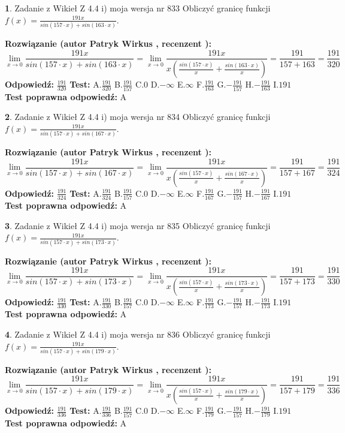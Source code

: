 \documentclass[12pt, a4paper]{article}
\theoremstyle{definition} %
\newtheorem{zad}{}
\newcommand{\zadStart}[1]{\begin{zad}#1\newline}
\newcommand{\zadStop}{\end{zad}}
\newcommand{\rozwStart}[2]{\noindent \textbf{Rozwiązanie (autor #1 , recenzent #2): }\newline}
\newcommand{\rozwStop}{\newline}
\newcommand{\odpStart}{\noindent \textbf{Odpowiedź:}\newline}
\newcommand{\odpStop}{\newline}
\newcommand{\testStart}{\noindent \textbf{Test:}\newline}
\newcommand{\testStop}{\newline}
\newcommand{\kluczStart}{\noindent \textbf{Test poprawna odpowiedź:}\newline}
\newcommand{\kluczStop}{\newline}
\begin{document}
\zadStart{Zadanie z Wikieł Z 4.4 i) moja wersja nr 833}
Obliczyć granicę funkcji $f(x)=\frac{191x}{sin(157\cdot x) +sin(163\cdot x)}$.
\zadStop
\rozwStart{Patryk Wirkus}{}
$$\lim\limits_{x\to 0}\frac{191x}{sin(157\cdot x) +sin(163\cdot x)}=\lim\limits_{x\to 0}\frac{191x}{x(\frac{sin(157\cdot x)}{x}+\frac{sin(163\cdot x)}{x})}=\frac{191}{157+163} = \frac{191}{320}$$
\rozwStop
\odpStart
$\frac{191}{320}$
\odpStop
\testStart
A.$\frac{191}{320}$
B.$\frac{191}{157}$
C.$0$
D.$-\infty$
E.$\infty$
F.$\frac{191}{163}$
G.$-\frac{191}{157}$
H.$-\frac{191}{163}$
I.$191$
\testStop
\kluczStart
A
\kluczStop



\zadStart{Zadanie z Wikieł Z 4.4 i) moja wersja nr 834}
Obliczyć granicę funkcji $f(x)=\frac{191x}{sin(157\cdot x) +sin(167\cdot x)}$.
\zadStop
\rozwStart{Patryk Wirkus}{}
$$\lim\limits_{x\to 0}\frac{191x}{sin(157\cdot x) +sin(167\cdot x)}=\lim\limits_{x\to 0}\frac{191x}{x(\frac{sin(157\cdot x)}{x}+\frac{sin(167\cdot x)}{x})}=\frac{191}{157+167} = \frac{191}{324}$$
\rozwStop
\odpStart
$\frac{191}{324}$
\odpStop
\testStart
A.$\frac{191}{324}$
B.$\frac{191}{157}$
C.$0$
D.$-\infty$
E.$\infty$
F.$\frac{191}{167}$
G.$-\frac{191}{157}$
H.$-\frac{191}{167}$
I.$191$
\testStop
\kluczStart
A
\kluczStop



\zadStart{Zadanie z Wikieł Z 4.4 i) moja wersja nr 835}
Obliczyć granicę funkcji $f(x)=\frac{191x}{sin(157\cdot x) +sin(173\cdot x)}$.
\zadStop
\rozwStart{Patryk Wirkus}{}
$$\lim\limits_{x\to 0}\frac{191x}{sin(157\cdot x) +sin(173\cdot x)}=\lim\limits_{x\to 0}\frac{191x}{x(\frac{sin(157\cdot x)}{x}+\frac{sin(173\cdot x)}{x})}=\frac{191}{157+173} = \frac{191}{330}$$
\rozwStop
\odpStart
$\frac{191}{330}$
\odpStop
\testStart
A.$\frac{191}{330}$
B.$\frac{191}{157}$
C.$0$
D.$-\infty$
E.$\infty$
F.$\frac{191}{173}$
G.$-\frac{191}{157}$
H.$-\frac{191}{173}$
I.$191$
\testStop
\kluczStart
A
\kluczStop



\zadStart{Zadanie z Wikieł Z 4.4 i) moja wersja nr 836}
Obliczyć granicę funkcji $f(x)=\frac{191x}{sin(157\cdot x) +sin(179\cdot x)}$.
\zadStop
\rozwStart{Patryk Wirkus}{}
$$\lim\limits_{x\to 0}\frac{191x}{sin(157\cdot x) +sin(179\cdot x)}=\lim\limits_{x\to 0}\frac{191x}{x(\frac{sin(157\cdot x)}{x}+\frac{sin(179\cdot x)}{x})}=\frac{191}{157+179} = \frac{191}{336}$$
\rozwStop
\odpStart
$\frac{191}{336}$
\odpStop
\testStart
A.$\frac{191}{336}$
B.$\frac{191}{157}$
C.$0$
D.$-\infty$
E.$\infty$
F.$\frac{191}{179}$
G.$-\frac{191}{157}$
H.$-\frac{191}{179}$
I.$191$
\testStop
\kluczStart
A
\kluczStop
\end{document}
